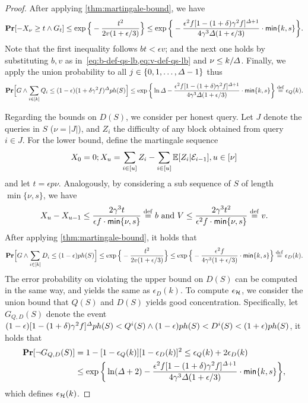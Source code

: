 \begin{proof}
    After applying \cref{thm:martingale-bound}, we have
    \[ \mathbf{Pr}[- X_{\nu} \ge t \wedge G_t] \le \exp \Big\{ - \frac{t^2}{2v(1 + \epsilon / 3)} \Big\} \le \exp \bigg\{ - \frac{\epsilon^2 f [1 - (1 + \delta) \gamma^2 f]^{\varDelta + 1}}{4\gamma^3 \varDelta (1 + \epsilon / 3)} \cdot \mathsf{min} \{k, s \} \bigg\}. \]
    Note that the first inequality follows $bt < \epsilon v$; and the next one holds by substituting $b, v$ as in~\cref{eq:b-def-qs-lb,eq:v-def-qs-lb} and $\nu \le k / \varDelta$.
    Finally, we apply the union probability to all $j \in \{ 0, 1, \ldots, \varDelta - 1 \}$ thus
    \[ \mathbf{Pr} \Big [G \wedge \sum_{i \in [k]} Q_i \le (1 - \epsilon)(1 + \delta \gamma^2 f)^\varDelta p h(S) \Big] \le \exp \bigg\{ \ln \varDelta - \frac{\epsilon^2 f [1 - (1 + \delta) \gamma^2 f]^{\varDelta + 1}}{4 \gamma^3 \varDelta (1 + \epsilon / 3)} \cdot \mathsf{min} \{k, s \} \bigg\} \overset{\mathrm{def}}{=} \epsilon_Q(k). \]

    Regarding the bounds on $D(S)$, we consider per honest query.
    Let $J$ denote the queries in $S$ ($\nu = |J|$), and $Z_i$ the difficulty of any block obtained from query $i \in J$.
    For the lower bound, define the martingale sequence
    \[ X_0 = 0; X_u = \sum_{i \in [u]} Z_i - \sum_{i \in [u]} \mathbb{E} [Z_i | \mathcal{E}_{i - 1}], u \in [\nu] \]
    and let $t = \epsilon p \nu$.
    Analogously, by considering a sub sequence of $S$ of length $\min \{ \nu, s \}$, we have
    \[ X_u - X_{u - 1}  \le \frac{2 \gamma^3 t}{\epsilon f \cdot \mathsf{min}\{ \nu, s \}} \overset{\mathrm{def}}{=} b ~\mathrm{and}~ V \le \frac{2\gamma^3 t^2}{\epsilon^2  f \cdot \mathsf{min}\{ \nu, s \}} \overset{\mathrm{def}}{=} v. \]
    After applying \cref{thm:martingale-bound}, it holds that
    \[ \mathbf{Pr} \Big [G \wedge \sum_{i \in [k]} D_i \le (1 - \epsilon) p h(S) \Big] \le \exp \Big\{ - \frac{t^2}{2v(1 + \epsilon / 3)} \Big\} \le \exp \Big\{ - \frac{\epsilon^2 f}{4\gamma^3 (1 + \epsilon / 3)} \cdot \mathsf{min} \{ k, s \} \Big\} \overset{\mathrm{def}}{=} \epsilon_D(k). \]
    The error probability on violating the upper bound on $D(S)$ can be computed in the same way, and yields the same as $\epsilon_D(k)$.
    To compute $\epsilon_\mathcal{H}$, we consider the union bound that $Q(S)$ and $D(S)$ yields good concentration.
    Specifically, let $G_{Q,D}(S)$ denote the event $(1 - \epsilon)[1 - (1 + \delta)\gamma^2 f]^{\varDelta} p h(S) < Q^i(S) \wedge (1 - \epsilon) p h(S) < D^i(S) < (1 + \epsilon) p h(S)$, it holds that
    \begin{align*}
        \mathbf{Pr}[\neg G_{Q,D}(S)]
         & =
        1 - [1 - \epsilon_Q(k)] [1 - \epsilon_{D}(k)]^2
        \le
        \epsilon_Q(k) + 2 \epsilon_{D}(k) \\
         & \le
        \exp \bigg\{ \ln (\varDelta + 2) - \frac{\epsilon^2 f [1 - (1 + \delta) \gamma^2 f]^{\varDelta + 1}}{4 \gamma^3 \varDelta (1 + \epsilon / 3)} \cdot \mathsf{min} \{k, s \} \bigg\},
    \end{align*}
    which defines $\epsilon_\mathcal{H}(k)$.
\end{proof}

